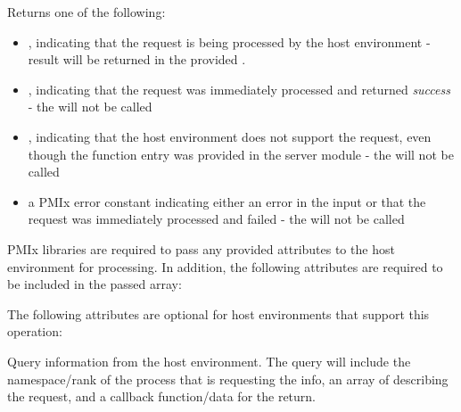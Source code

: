 Returns one of the following:

\begin{itemize}
    \item {}, indicating that the request is being processed by the host environment - result will be returned in the provided .
    \item {}, indicating that the request was immediately processed and returned \textit{success} - the  will not be called
    \item {}, indicating that the host environment does not support the request, even though the function entry was provided in the server module - the  will not be called
    \item a PMIx error constant indicating either an error in the input or that the request was immediately processed and failed - the  will not be called
\end{itemize}

\reqattrstart
\ac{PMIx} libraries are required to pass any provided attributes to the host environment for processing. In addition, the following attributes are required to be included in the passed  array:


\reqattrend


\optattrstart
The following attributes are optional for host environments that support this operation:


\optattrend
\descr

Query information from the host environment.
The query will include the namespace/rank of the process that is requesting the info, an array of  describing the request, and a callback function/data for the return.

